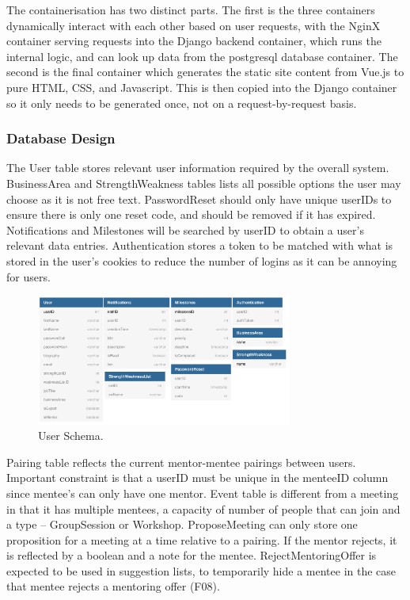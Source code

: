 \documentclass[10pt]{article}
\begin{document}
The containerisation has two distinct parts. The first is the three containers
dynamically interact with each other based on user requests, with the NginX
container serving requests into the Django backend container, which runs the
internal logic, and can look up data from the postgresql database container. The
second is the final container which generates the static site content from
Vue.js to pure HTML, CSS, and Javascript. This is then copied into the Django
container so it only needs to be generated once, not on a request-by-request
basis.

\subsubsection{Database Design}

The User table stores relevant user information required by the overall system.
BusinessArea and StrengthWeakness tables lists all possible options the user may
choose as it is not free text. PasswordReset should only have unique userIDs to
ensure there is only one reset code, and should be removed if it has expired.
Notifications and Milestones will be searched by userID to obtain a user’s
relevant data entries. Authentication stores a token to be matched with what is
stored in the user's cookies to reduce the number of logins as it can be
annoying for users.
\begin{figure}[H]
    \centering
    \includegraphics[width=0.75\textwidth]{UserDB}
    \caption{User Schema.}
    \label{fig:User Schema}
\end{figure}

Pairing table reflects the current mentor-mentee pairings between users.
Important constraint is that a userID must be unique in the menteeID column
since mentee’s can only have one mentor. Event table is different from a meeting
in that it has multiple mentees, a capacity of number of people that can join
and a type – GroupSession or Workshop. ProposeMeeting can only store one
proposition for a meeting at a time relative to a pairing. If the mentor
rejects, it is reflected by a boolean and a note for the mentee.
RejectMentoringOffer is expected to be used in suggestion lists, to temporarily
hide a mentee in the case that mentee rejects a mentoring offer (F08).
\end{document}
